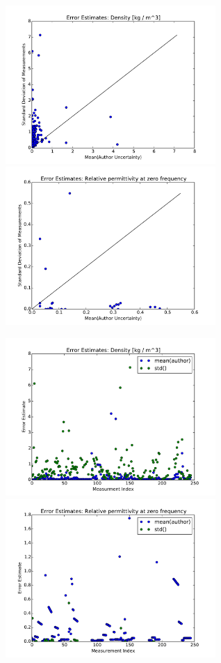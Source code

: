 \documentclass[journal=jacsat,manuscript=article]{achemso}
\begin{document}
\begin{figure}

\includegraphics[width=8cm]{./figures/error_analysis_density.pdf}
\includegraphics[width=8cm]{./figures/error_analysis_dielectric.pdf}

\includegraphics[width=8cm]{./figures/error_analysis_density_index.pdf}
\includegraphics[width=8cm]{./figures/error_analysis_dielectric_index.pdf}


\end{figure}
\end{document}

